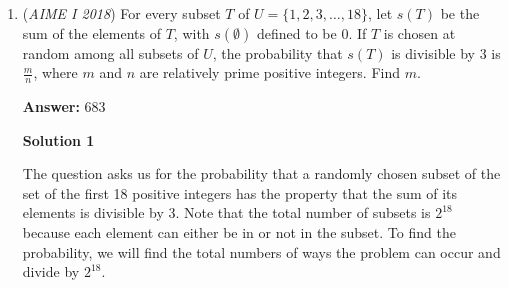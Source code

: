 \begin{enumerate}
 $3^{5k} = (3^5)^k = 243^k = (2 \cdot 11^2 + 1)^k \equiv 1^k \equiv 1 \mod 11^2$ so $n = 5k$ automatically satisfies the $11^2$ condition. Now, for $3^n \equiv 1 \mod 13$, we instantly see $3^3 = 27 \equiv 1 \mod 13$ so $3 | n$. Thus, we can write $n = 5 \cdot 3 \cdot k = 15k$. Thus, we need

 $3^{15k} \equiv 1 \mod 169$. Now computing $3^{15}$ requires some bash, but it isn't bad at all after this is computed. Ok, first $3^15 = (3^5)^3 = (243)^3 \equiv (243 - 169)^3 \mod 169 \equiv 74^3 \mod 169$. We have to manually compute $74^2 = (70 + 4)^2 = 4900 + 560 + 16 = 5476$ and we do long division to get $5476 \equiv 68 \mod 169$ thus we compute $68 \cdot 74 \mod 169$ and notice $68 \cdot 74 = (71 - 3)(71 + 3) = (70 + 1)^2 - 9 = 4900 + 140 + 1 - 9 = 5040 - 8 = 5032$ thus $5032 \mod 169 \equiv 131 \mod 169$ from long division. Thus, we just need to solve

 $131^k \equiv 1 \mod 169$. Here, we use Lifting the Exponent Lemma or LTE. We have $v_{13}(131^k - 1^k) = 2$ since $169$ has $2$ powers of $13$ and $v_x(y)$ denotes the highest power of $x$ that divides $y$. By LTE, since $13 | 131 - 1$, we have

 $v_{13}(131 - 1) + v_{13}(k) = v_{13}(131^k - 1^k) = 2 \implies v_{13}(13 \cdot 10) + v_{13}(k) = 2 \implies 1 + v_{13}(k) = 2 \implies v_{13}(k) = 1$ thus $13 | k$.

 All in all, we see that we can now write $k = 13j$ so $n = 15k = 15 \cdot 13j = 195j$ and this value satisfies all the conditions of the problem. The minimum positive integer value of $n$ occurs at $j = 1$ thus $\boxed{195}$



	\item (\textit{AIME I 2018}) For every subset $T$ of $U = \{ 1,2,3,\ldots,18 \}$, let $s(T)$ be the sum of the elements of $T$, with $s(\emptyset)$ defined to be $0$. If $T$ is chosen at random among all subsets of $U$, the probability that $s(T)$ is divisible by $3$ is $\frac{m}{n}$, where $m$ and $n$ are relatively prime positive integers. Find $m$.


 
 \textbf{Answer: }683



\textbf{Solution 1}

The question asks us for the probability that a randomly chosen subset of the set of the first 18 positive integers has the property that the sum of its elements is divisible by 3. Note that the total number of subsets is $2^{18}$ because each element can either be in or not in the subset. To find the probability, we will find the total numbers of ways the problem can occur and divide by $2^{18}$.


\end{enumerate}
